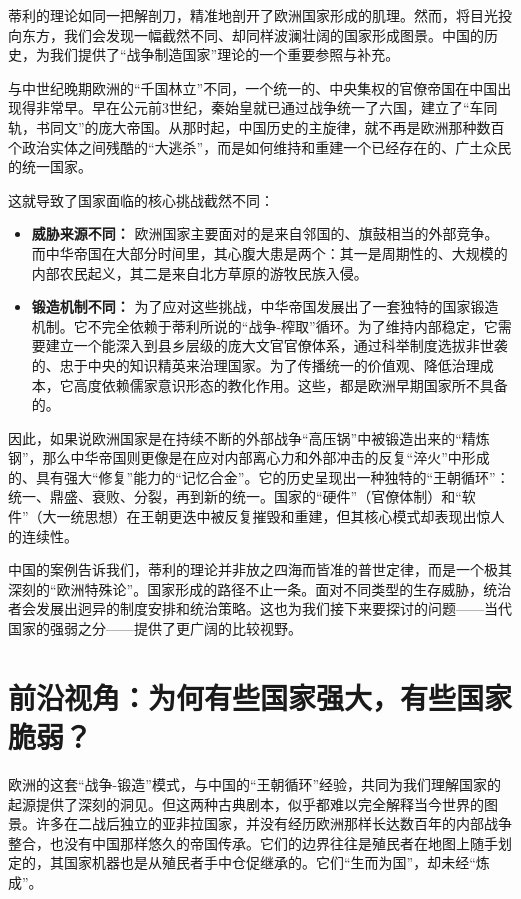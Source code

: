 \documentclass[a5paper, 11pt, openany]{ctexbook}
\begin{document}
蒂利的理论如同一把解剖刀，精准地剖开了欧洲国家形成的肌理。然而，将目光投向东方，我们会发现一幅截然不同、却同样波澜壮阔的国家形成图景。中国的历史，为我们提供了“战争制造国家”理论的一个重要参照与补充。

与中世纪晚期欧洲的“千国林立”不同，一个统一的、中央集权的官僚帝国在中国出现得非常早。早在公元前3世纪，秦始皇就已通过战争统一了六国，建立了“车同轨，书同文”的庞大帝国。从那时起，中国历史的主旋律，就不再是欧洲那种数百个政治实体之间残酷的“大逃杀”，而是如何维持和重建一个已经存在的、广土众民的统一国家。

这就导致了国家面临的核心挑战截然不同：

\begin{itemize}
    \item \textbf{威胁来源不同：} 欧洲国家主要面对的是来自邻国的、旗鼓相当的外部竞争。而中华帝国在大部分时间里，其心腹大患是两个：其一是周期性的、大规模的内部农民起义，其二是来自北方草原的游牧民族入侵。
    \item \textbf{锻造机制不同：} 为了应对这些挑战，中华帝国发展出了一套独特的国家锻造机制。它不完全依赖于蒂利所说的“战争-榨取”循环。为了维持内部稳定，它需要建立一个能深入到县乡层级的庞大文官官僚体系，通过科举制度选拔非世袭的、忠于中央的知识精英来治理国家。为了传播统一的价值观、降低治理成本，它高度依赖儒家意识形态的教化作用。这些，都是欧洲早期国家所不具备的。
\end{itemize}

因此，如果说欧洲国家是在持续不断的外部战争“高压锅”中被锻造出来的“精炼钢”，那么中华帝国则更像是在应对内部离心力和外部冲击的反复“淬火”中形成的、具有强大“修复”能力的“记忆合金”。它的历史呈现出一种独特的“王朝循环”：统一、鼎盛、衰败、分裂，再到新的统一。国家的“硬件”（官僚体制）和“软件”（大一统思想）在王朝更迭中被反复摧毁和重建，但其核心模式却表现出惊人的连续性。

中国的案例告诉我们，蒂利的理论并非放之四海而皆准的普世定律，而是一个极其深刻的“欧洲特殊论”。国家形成的路径不止一条。面对不同类型的生存威胁，统治者会发展出迥异的制度安排和统治策略。这也为我们接下来要探讨的问题——当代国家的强弱之分——提供了更广阔的比较视野。

\section{前沿视角：为何有些国家强大，有些国家脆弱？}

欧洲的这套“战争-锻造”模式，与中国的“王朝循环”经验，共同为我们理解国家的起源提供了深刻的洞见。但这两种古典剧本，似乎都难以完全解释当今世界的图景。许多在二战后独立的亚非拉国家，并没有经历欧洲那样长达数百年的内部战争整合，也没有中国那样悠久的帝国传承。它们的边界往往是殖民者在地图上随手划定的，其国家机器也是从殖民者手中仓促继承的。它们“生而为国”，却未经“炼成”。
\end{document}
